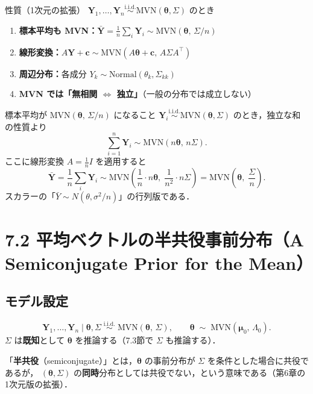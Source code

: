 \documentclass[lualatex,ja=standard,a4paper,12pt]{bxjsarticle}
\newcommand{\mvn}{\mathrm{MVN}}
\begin{document}
\begin{thmbox}{性質（1次元の拡張）}
$\bm{Y}_1, \ldots, \bm{Y}_n \overset{\mathrm{i.i.d.}}{\sim} \mvn(\bm{\theta}, \Sigma)$ のとき
\begin{enumerate}
  \item \textbf{標本平均も MVN：}$\bar{\bm{Y}} = \frac{1}{n}\sum_i \bm{Y}_i \sim \mvn(\bm{\theta},\, \Sigma/n)$
  \item \textbf{線形変換：}$A\bm{Y} + \bm{c} \sim \mvn(A\bm{\theta} + \bm{c},\, A\Sigma A^\top)$
  \item \textbf{周辺分布：}各成分 $Y_k \sim \mathrm{Normal}(\theta_k, \Sigma_{kk})$
  \item \textbf{MVN では「無相関 $\Leftrightarrow$ 独立」}（一般の分布では成立しない）
\end{enumerate}
\end{thmbox}

\begin{derivbox}{標本平均が $\mvn(\bm{\theta},\, \Sigma/n)$ になること}
$\bm{Y}_i \overset{\mathrm{i.i.d.}}{\sim} \mvn(\bm{\theta}, \Sigma)$ のとき，独立な和の性質より
\[
  \sum_{i=1}^n \bm{Y}_i \sim \mvn(n\bm{\theta},\, n\Sigma).
\]
ここに線形変換 $A = \frac{1}{n}I$ を適用すると
\[
  \bar{\bm{Y}} = \frac{1}{n}\sum_i \bm{Y}_i \sim \mvn\!\left(\frac{1}{n}\cdot n\bm{\theta},\; \frac{1}{n^2}\cdot n\Sigma\right) = \mvn\!\left(\bm{\theta},\; \frac{\Sigma}{n}\right).
\]
スカラーの「$\bar{Y} \sim N(\theta, \sigma^2/n)$」の行列版である．
\end{derivbox}

\section{7.2 平均ベクトルの半共役事前分布（A Semiconjugate Prior for the Mean）}

\subsection{モデル設定}

\[
  \bm{Y}_1, \ldots, \bm{Y}_n \mid \bm{\theta}, \Sigma
  \;\overset{\mathrm{i.i.d.}}{\sim}\; \mvn(\bm{\theta},\, \Sigma),
  \qquad
  \bm{\theta} \;\sim\; \mvn(\bm{\mu}_0,\, \Lambda_0).
\]
$\Sigma$ は\textbf{既知}として $\bm{\theta}$ を推論する（7.3節で $\Sigma$ も推論する）．

\begin{pointbox}
「\textbf{半共役}（semiconjugate）」とは，$\bm{\theta}$ の事前分布が $\Sigma$ を条件とした場合に共役であるが，
$(\bm{\theta}, \Sigma)$ の\textbf{同時}分布としては共役でない，という意味である（第6章の1次元版の拡張）．
\end{pointbox}
\end{document}
